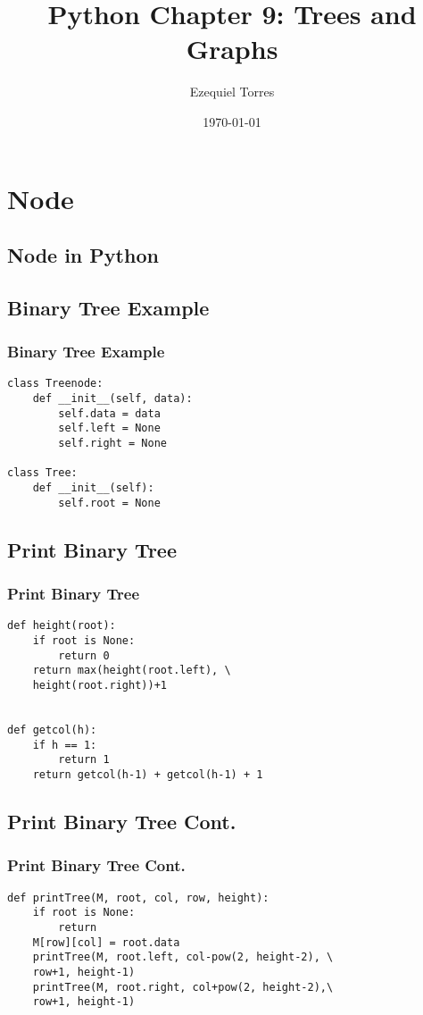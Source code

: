 \documentclass{beamer}
\begin{document}
\title{Python Chapter 9: Trees and Graphs}
\author{Ezequiel Torres}
\date{\today}
\frame{\titlepage}

\section{Node}
\subsection{Node in Python}


\begin{frame}[fragile]
\subsection{Binary Tree Example}
\frametitle{Binary Tree Example}
\begin{lstlisting}
class Treenode:
    def __init__(self, data):
        self.data = data
        self.left = None
        self.right = None
 
class Tree:
    def __init__(self):
        self.root = None
\end{lstlisting}
\end{frame}

\begin{frame}[fragile]
\subsection{Print Binary Tree}
\frametitle{Print Binary Tree}
\begin{lstlisting}
def height(root):
    if root is None:
        return 0
    return max(height(root.left), \
    height(root.right))+1
 
 
def getcol(h):
    if h == 1:
        return 1
    return getcol(h-1) + getcol(h-1) + 1
\end{lstlisting}
\end{frame}

\begin{frame}[fragile]
\subsection{Print Binary Tree Cont.}
\frametitle{Print Binary Tree Cont.}
\begin{lstlisting}
def printTree(M, root, col, row, height):
    if root is None:
        return
    M[row][col] = root.data
    printTree(M, root.left, col-pow(2, height-2), \ 
    row+1, height-1)
    printTree(M, root.right, col+pow(2, height-2),\ 
    row+1, height-1)
\end{lstlisting}
\end{frame}
\end{document}
